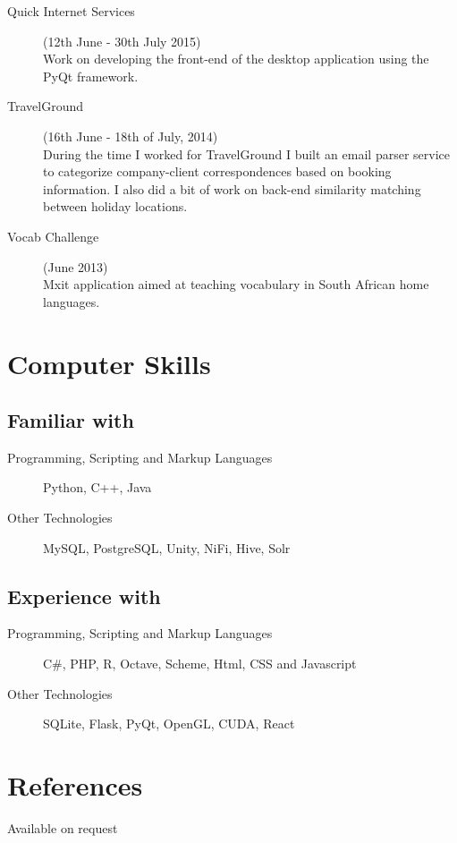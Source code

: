 \documentclass[margin,line,a4paper]{resume}
\begin{document}
\begin{resume}
\begin{description}
                \item[Quick Internet Services] (12th June - 30th July 2015) \\
                    Work on developing the front-end of the desktop application using the PyQt framework.

                \item[TravelGround] (16th June - 18th of July, 2014) \\
                    During the time I worked for TravelGround I built an email parser service to categorize company-client correspondences based on booking information. I also did a bit of work on back-end similarity matching between holiday locations.

                \item[Vocab Challenge] (June 2013) \\
                    Mxit application aimed at teaching vocabulary in South African home languages.

            \end{description}

        \section{\mysidestyle Computer Skills}
        \subsection{\mysidestyle Familiar with}
            \begin{description}
                \item [Programming, Scripting and Markup Languages] Python, C++, Java
                \item [Other Technologies] MySQL, PostgreSQL, Unity, NiFi, Hive, Solr
            \end{description}

        \subsection{\mysidestyle Experience with}
            \begin{description}
                \item [Programming, Scripting and Markup Languages] C\#, PHP, R, Octave, Scheme, Html, CSS and Javascript
                \item [Other Technologies] SQLite, Flask, PyQt, OpenGL, CUDA, React 
            \end{description}

        \section{\mysidestyle References}
            Available on request
    \end{resume}
\end{document}

